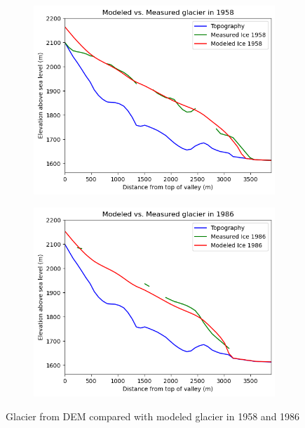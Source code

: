 \documentclass{article}
\begin{document}
\begin{figure}[h!]
    \centering
    \begin{subfigure}[b]{0.49\textwidth}
        \centering
        \includegraphics[width=\textwidth]{Plots/1958_glacier_comparison.png}
        \label{fig:1958_glacier_comparison}
    \end{subfigure}
    \hfill
    \begin{subfigure}[b]{0.49\textwidth}
        \centering
        \includegraphics[width=\textwidth]{Plots/1986_glacier_comparison.png}
        \label{fig:v}
    \end{subfigure}
    \caption{Glacier from DEM compared with modeled glacier in 1958 and 1986}
    \label{fig:1986_glacier_comparison}
\end{figure}
\FloatBarrier
\end{document}
